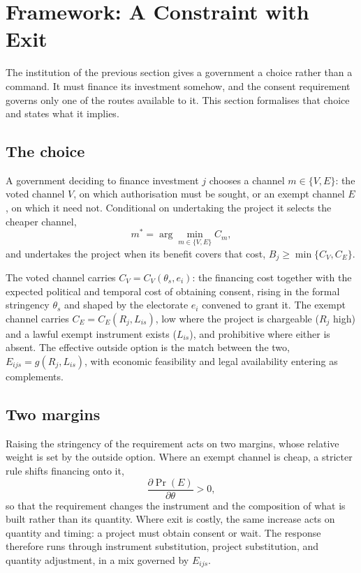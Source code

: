 \section{Framework: A Constraint with Exit}

The institution of the previous section gives a government a choice rather than
a command. It must finance its investment somehow, and the consent requirement
governs only one of the routes available to it. This section formalises that
choice and states what it implies.

\subsection{The choice}

A government deciding to finance investment $j$ chooses a channel
$m \in \{V, E\}$: the voted channel $V$, on which authorisation must be sought,
or an exempt channel $E$, on which it need not. Conditional on undertaking the
project it selects the cheaper channel,
\[
m^{*} = \arg\min_{m \in \{V,E\}} C_m,
\]
and undertakes the project when its benefit covers that cost,
$B_j \geq \min\{C_V, C_E\}$.

The voted channel carries $C_V = C_V(\theta_s, e_i)$: the financing cost
together with the expected political and temporal cost of obtaining consent,
rising in the formal stringency $\theta_s$ and shaped by the electorate $e_i$
convened to grant it. The exempt channel carries $C_E = C_E(R_j, L_{is})$, low
where the project is chargeable ($R_j$ high) and a lawful exempt instrument
exists ($L_{is}$), and prohibitive where either is absent. The effective
outside option is the match between the two, $E_{ijs} = g(R_j, L_{is})$, with
economic feasibility and legal availability entering as complements.

\subsection{Two margins}

Raising the stringency of the requirement acts on two margins, whose relative
weight is set by the outside option. Where an exempt channel is cheap, a
stricter rule shifts financing onto it,
\[
\frac{\partial \Pr(E)}{\partial \theta} > 0,
\]
so that the requirement changes the instrument and the composition of what is
built rather than its quantity. Where exit is costly, the same increase acts on
quantity and timing: a project must obtain consent or wait. The response
therefore runs through instrument substitution, project substitution, and
quantity adjustment, in a mix governed by $E_{ijs}$.

